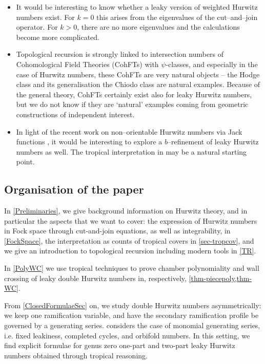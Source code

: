 \documentclass[10pt,a4paper,oneside,no-math,reqno]{amsart}%
\theoremstyle{plain}
\theoremstyle{definition}
\theoremstyle{remark}
\numberwithin{equation}{section}
\newcommand{\1}{\mathds{1}}
\newcommand{\<}{\langle}
\renewcommand{\>}{\rangle}
\begin{document}
\begin{itemize}
    \item It would be interesting to know whether a leaky version of weighted Hurwitz numbers exist. For $k=0$ this arises from the eigenvalues of the cut--and--join operator. For $k>0$, there are no more eigenvalues and the calculations become more complicated.
    \item Topological recursion is strongly linked \cite{DOSS14} to intersection numbers of Cohomological Field Theories (CohFTs) with $\psi$-classes, and especially in the case of Hurwitz numbers, these CohFTs are very natural objects -- the Hodge class and its generalisation the Chiodo class are natural examples. Because of the general theory, CohFTs certainly exist also for leaky Hurwitz numbers, but we do not know if they are `natural' examples coming from geometric constructions of independent interest.
    \item In light of the recent work on non--orientable Hurwitz numbers via Jack functions \cite{chapuy2022non}, it would be interesting to explore a $b$--refinement of leaky Hurwitz numbers as well. The tropical interpretation in \cite{fesler2025refined} may be a natural starting point.
\end{itemize}

\subsection{Organisation of the paper}

In \cref{Preliminaries}, we give background information on Hurwitz theory, and in particular the aspects that we want to cover: the expression of Hurwitz numbers in Fock space through cut-and-join equations, as well as integrability, in \cref{FockSpace}, the interpretation as counts of tropical covers in \cref{sec-tropcov}, and we give an introduction to topological recursion including modern tools in \cref{TR}.

In \cref{PolyWC} we use tropical techniques to prove chamber polynomiality and wall crossing of leaky double Hurwitz numbers in, respectively, \cref{thm-piecepoly,thm-WC}.

From \cref{ClosedFormulaeSec} on, we study double Hurwitz numbers asymmetrically: we keep one ramification variable, and have the secondary ramification profile be governed by a generating series.  considers the case of monomial generating series, i.e. fixed leakiness, completed cycles, and orbifold numbers. In this setting, we find explicit formulae for genus zero one-part and two-part leaky Hurwitz numbers obtained through tropical reasoning.
\end{document}
